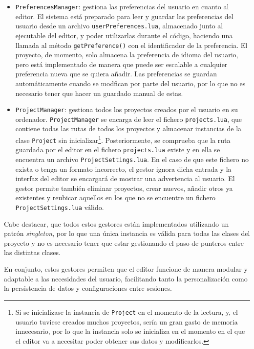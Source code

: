 \begin{itemize}
	\item \texttt{PreferencesManager}: gestiona las preferencias del usuario en cuanto al editor. El sistema está preparado para leer y guardar las preferencias del usuario desde un archivo \texttt{userPreferences.lua}, almacenado junto al ejecutable del editor, y poder utilizarlas durante el código, haciendo una llamada al método \texttt{getPreference()} con el identificador de la preferencia. El proyecto, de momento, solo almacena la preferencia de idioma del usuario, pero está implementado de manera que puede ser escalable a cualquier preferencia nueva que se quiera añadir. Las preferencias se guardan automáticamente cuando se modfican por parte del usuario, por lo que no es necesario tener que hacer un guardado manual de estas.
	\item \texttt{ProjectManager}: gestiona todos los proyectos creados por el usuario en su ordenador. \texttt{ProjectManager} se encarga de leer el fichero \texttt{projects.lua}, que contiene todas las rutas de todos los proyectos y almacenar instancias de la clase \texttt{Project} sin inicializar\footnote{Si se inicializase la instancia de \texttt{Project} en el momento de la lectura, y, el usuario tuviese creados muchos proyectos, sería un gran gasto de memoria innecesario, por lo que la instancia solo se inicializa en el momento en el que el editor va a necesitar poder obtener sus datos y modificarlos.}. Posteriormente, se comprueba que la ruta guardada por el editor en el fichero \texttt{projects.lua} existe y en ella se encuentra un archivo \texttt{ProjectSettings.lua}. En el caso de que este fichero no exista o tenga un formato incorrecto, el gestor ignora dicha entrada y la interfaz del editor se encargará de mostrar una advertencia al usuario. El gestor permite también eliminar proyectos, crear nuevos, añadir otros ya existentes y reubicar aquellos en los que no se encuentre un fichero \texttt{ProjectSettings.lua} válido.
\end{itemize}

Cabe destacar, que todos estos gestores están implementados utilizando un patrón \textit{singleton}, por lo que una única instancia es válida para todas las clases del proyecto y no es necesario tener que estar gestionando el paso de punteros entre las distintas clases.

\medskip

En conjunto, estos gestores permiten que el editor funcione de manera modular y adaptable a las necesidades del usuario, facilitando tanto la personalización como la persistencia de datos y configuraciones entre sesiones.

